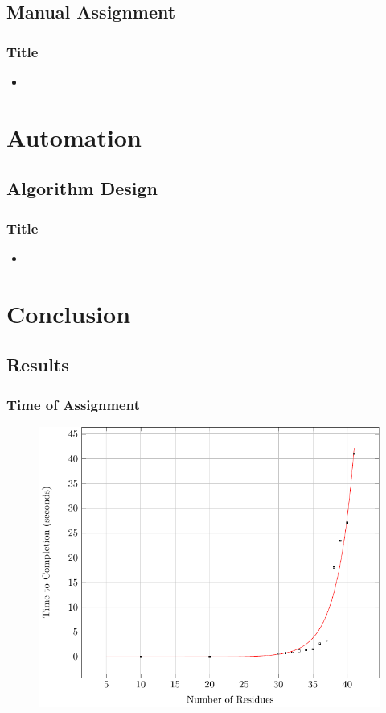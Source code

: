 \documentclass{beamer}
\begin{document}
\subsection{Manual Assignment}
\begin{frame}
	\frametitle{Title}
	\begin{itemize}
		\item 
	\end{itemize}

\end{frame}


\section{Automation}

\subsection{Algorithm Design}
\begin{frame}
	\frametitle{Title}
	\begin{itemize}
		\item 
	\end{itemize}
\end{frame}


\section{Conclusion}

\subsection{Results}

\begin{frame}
	\frametitle{Time of Assignment}
	\begin{figure}[H]
	\begin{center}
	\includegraphics[width=.65\textwidth]{plot}
	\end{center}
	\end{figure}
\end{frame}
\end{document}
